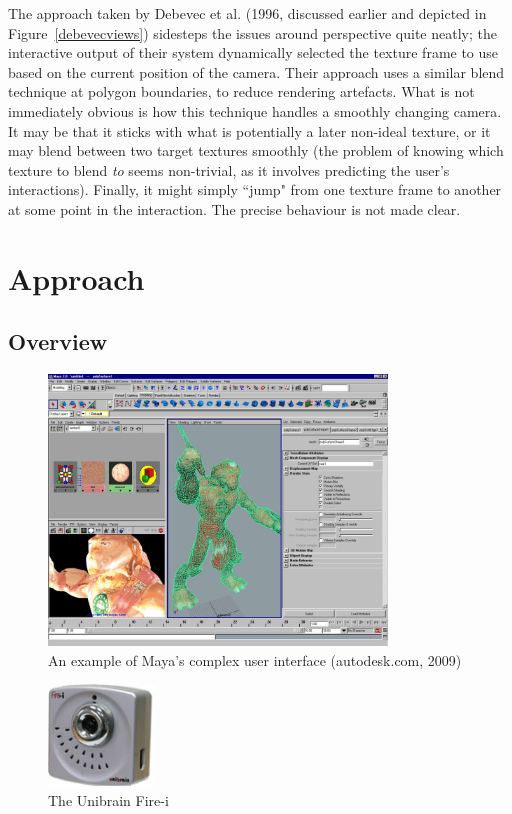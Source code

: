 \documentclass[a4paper,10pt]{report}
\begin{document}
The approach taken by Debevec et al. (1996, discussed earlier and depicted in Figure~\ref{debevecviews}) sidesteps the issues around perspective quite neatly; the interactive output of their system dynamically selected the texture frame to use based on the current position of the camera. Their approach uses a similar blend technique at polygon boundaries, to reduce rendering artefacts. What is not immediately obvious is how this technique handles a smoothly changing camera. It may be that it sticks with what is potentially a later non-ideal texture, or it may blend between two target textures smoothly (the problem of knowing which texture to blend \textit{to} seems non-trivial, as it involves predicting the user's interactions). Finally, it might simply ``jump" from one texture frame to another at some point in the interaction. The precise behaviour is not made clear.

\clearpage


\chapter{Approach}
\section{Overview}
\begin{figure}
  \begin{center}
    \includegraphics[width=340px]{maya}
  \end{center}
  \caption[An example of Maya's complex user interface]{An example of Maya's complex user interface (autodesk.com, 2009)}
  \label{maya}
\end{figure}

\begin{figure}
  \vspace{-20pt}
  \begin{center}
    \includegraphics[width=80pt]{firei}
  \end{center}
  \caption{The Unibrain Fire-i\texttrademark}
  \label{firei}
\end{figure}
\end{document}
